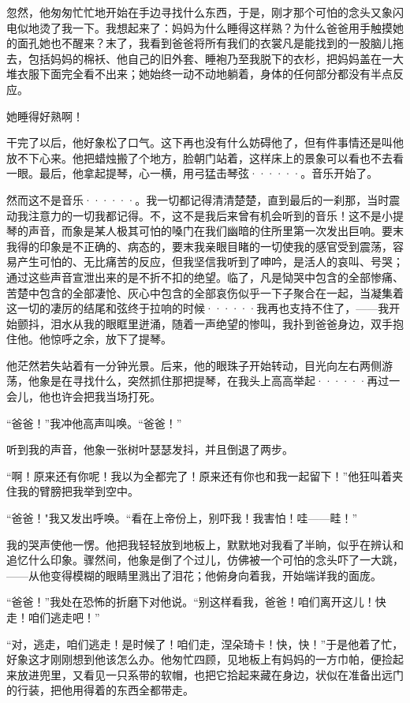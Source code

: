 \documentclass[12pt, UTF8]{ctexbook}
\begin{document}
\par 忽然，他匆匆忙忙地开始在手边寻找什么东西，于是，刚才那个可怕的念头又象闪电似地烫了我一下。我想起来了：妈妈为什么睡得这样熟？为什么爸爸用手触摸她的面孔她也不醒来？末了，我看到爸爸将所有我们的衣裳凡是能找到的一股脑儿拖去，包括妈妈的棉袄、他自己的旧外套、睡袍乃至我脱下的衣杉，把妈妈盖在一大堆衣服下面完全看不出来；她始终一动不动地躺着，身体的任何部分都没有半点反应。
\par 她睡得好熟啊！
\par 干完了以后，他好象松了口气。这下再也没有什么妨碍他了，但有件事情还是叫他放不下心来。他把蜡烛搬了个地方，脸朝门站着，这样床上的景象可以看也不去看一眼。最后，他拿起提琴，心一横，用弓猛击琴弦······。音乐开始了。
\par 然而这不是音乐······。我一切都记得清清楚楚，直到最后的一刹那，当时震动我注意力的一切我都记得。不，这不是我后来曾有机会听到的音乐！这不是小提琴的声音，而象是某人极其可怕的嗓门在我们幽暗的住所里第一次发出巨响。要末我得的印象是不正确的、病态的，要末我亲眼目睹的一切使我的感官受到震荡，容易产生可怕的、无比痛苦的反应，但我坚信我听到了呻吟，是活人的哀叫、号哭；通过这些声音宣泄出来的是不折不扣的绝望。临了，凡是恸哭中包含的全部惨痛、苦楚中包含的全部凄怆、灰心中包含的全部哀伤似乎一下子聚合在一起，当凝集着这一切的凄厉的结尾和弦终于拉响的时候······我再也支持不住了，——我开始颤抖，泪水从我的眼眶里迸涌，随着一声绝望的惨叫，我扑到爸爸身边，双手抱住他。他惊呼之余，放下了提琴。
\par 他茫然若失站着有一分钟光景。后来，他的眼珠子开始转动，目光向左右两侧游荡，他象是在寻找什么，突然抓住那把提琴，在我头上高高举起······再过一会儿，他也许会把我当场打死。
\par “爸爸！”我冲他高声叫唤。“爸爸！”
\par 听到我的声音，他象一张树叶瑟瑟发抖，并且倒退了两步。
\par “啊！原来还有你呢！我以为全都完了！原来还有你也和我一起留下！”他狂叫着夹住我的臂膀把我举到空中。
\par “爸爸！"我又发出呼唤。“看在上帝份上，别吓我！我害怕！哇——畦！”
\par 我的哭声使他一愣。他把我轻轻放到地板上，默默地对我看了半晌，似乎在辨认和追忆什么印象。骤然间，他象是倒了个过儿，仿佛被一个可怕的念头吓了一大跳，——从他变得模糊的眼睛里溅出了泪花；他俯身向着我，开始端详我的面庞。
\par “爸爸！”我处在恐怖的折磨下对他说。“别这样看我，爸爸！咱们离开这儿！快走！咱们逃走吧！”
\par “对，逃走，咱们逃走！是时候了！咱们走，涅朵琦卡！快，快！”于是他着了忙，好象这才刚刚想到他该怎么办。他匆忙四顾，见地板上有妈妈的一方巾帕，便捡起来放进兜里，又看见一只系带的软帽，也把它拾起来藏在身边，状似在准备出远门的行装，把他用得着的东西全都带走。
\end{document}
